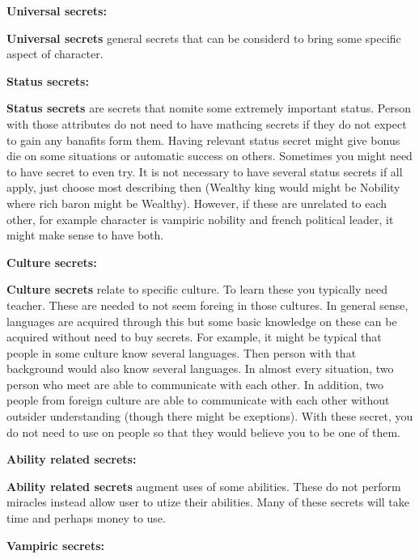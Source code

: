 \documentclass[a4paper, 12pt, finnish]{article}
\begin{document}
{\textbf{Universal secrets:}

\textbf{Universal secrets} general secrets that can be considerd to bring some specific aspect of character.

\cols{
\UniversalSecret{}
}

\textbf{Status secrets:}

\textbf{Status secrets} are secrets that nomite some extremely important status. 
Person with those attributes do not need to have mathcing secrets if they do not expect to gain any banafits form them.
Having relevant status secret might give bonus die on some situations or automatic success on others.
Sometimes you might need to have secret to even try.
It is not necessary to have several status secrets if all apply, just choose most describing then (Wealthy king would might be Nobility where rich baron might be Wealthy).
However, if these are unrelated to each other, for example character is vampiric nobility and french political leader, it might make sense to have both.

\cols{
\StatusSecret{}
}


\textbf{Culture secrets:}

\textbf{Culture secrets} relate to specific culture.
To learn these you typically need teacher.
These are needed to not seem foreing in those cultures.
In general sense, languages are acquired through this but some basic knowledge on these can be acquired without need to buy secrets.
For example, it might be typical that people in some culture know several languages.
Then person with that background would also know several languages.
In almost every situation, two person who meet are able to communicate with each other.
In addition, two people from foreign culture are able to communicate with each other without outsider understanding (though there might be exeptions).
With these secret, you do not need to use \AbilityNameDeceit{} on people so that they would believe you to be one of them.

\cols{
\CultureSecret{}
}

\textbf{Ability related secrets:}

\textbf{Ability related secrets} augment uses of some abilities. 
These do not perform miracles instead allow user to utize their abilities.
Many of these secrets will take time and perhaps money to use.

\cols{
\AbilitySecret{}
}


\pagebreak

\textbf{Vampiric secrets:}

}
\end{document}
